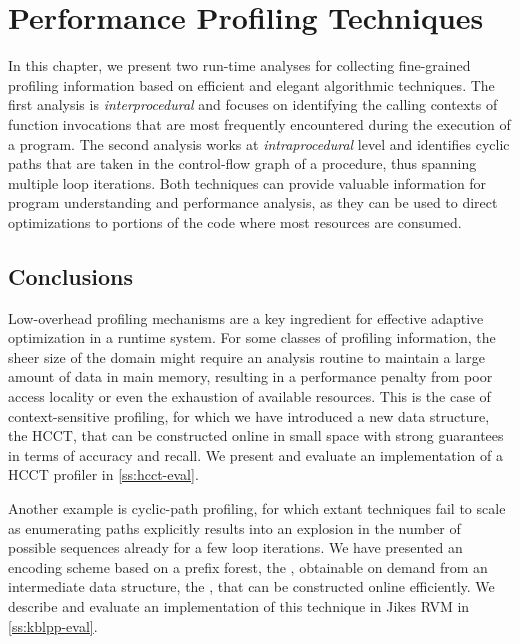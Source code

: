 \chapter{Performance Profiling Techniques}
\label{ch:profiling}

In this chapter, we present two run-time analyses for collecting fine-grained profiling information based on efficient and elegant algorithmic techniques. The first analysis is {\em interprocedural} and focuses on identifying the calling contexts of function invocations that are most frequently encountered during the execution of a program. The second analysis works at {\em intraprocedural} level and identifies cyclic paths that are taken in the control-flow graph of a procedure, thus spanning multiple loop iterations. Both techniques can provide valuable information for program understanding and performance analysis, as they can be used to direct optimizations to portions of the code where most resources are consumed.

\ifdefined\noauthorea

\newpage

\fi

\section{Conclusions}
Low-overhead profiling mechanisms are a key ingredient for effective adaptive optimization in a runtime system. For some classes of profiling information, the sheer size of the domain might require an analysis routine to maintain a large amount of data in main memory, resulting in a performance penalty from poor access locality or even the exhaustion of available resources. This is the case of context-sensitive profiling, for which we have introduced a new data structure, the HCCT, that can be constructed online in small space with strong guarantees in terms of accuracy and recall. We present and evaluate an implementation of a HCCT profiler in \mysection\ref{ss:hcct-eval}.

Another example is cyclic-path profiling, for which extant techniques fail to scale as enumerating paths explicitly results into an explosion in the number of possible sequences already for a few loop iterations. We have presented an encoding scheme based on a prefix forest, the \kipf, obtainable on demand from an intermediate data structure, the \ksf, that can be constructed online efficiently. We describe and evaluate an implementation of this technique in Jikes RVM in \mysection\ref{ss:kblpp-eval}.